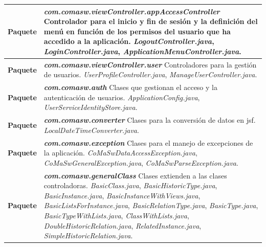 \begin{longtable}{m{1cm} m{11cm}}
\textbf{Paquete} & \textit{\textbf{com.comasw.viewController.appAccessController}} \newline
     Controlador para el inicio y fin de sesión y la definición del menú en función de los permisos del usuario que ha accedido a la aplicación.\newline
\textit{LogoutController.java},
\textit{LoginController.java},
\textit{ApplicationMenuController.java}.
	\\\hline


	\textbf{Paquete} & \textit{\textbf{com.comasw.viewController.user}} \newline
     Controladores para la gestión de usuarios.\newline
\textit{UserProfileController.java},
\textit{ManageUserController.java}.
	\\\hline

	\textbf{Paquete} & \textit{\textbf{com.comasw.auth}} \newline
     Clases que gestionan el acceso y la autenticación de usuarios.\newline
\textit{ApplicationConfig.java},
\textit{UserServiceIdentityStore.java}.
	\\\hline

	\textbf{Paquete} & \textit{\textbf{com.comasw.converter}} \newline
     Clases para la conversión de datos en \acrshort{jsf}.\newline
\textit{LocalDateTimeConverter.java}.
	\\\hline

	\textbf{Paquete} & \textit{\textbf{com.comasw.exception}} \newline
     Clases para el manejo de excepciones de la aplicación.\newline
\textit{CoMaSwDataAccessException.java},
\textit{CoMaSwGeneralException.java},
\textit{CoMaSwParseException.java}.
	\\\hline

	\textbf{Paquete} & \textit{\textbf{com.comasw.generalClass}} \newline
     Clases extienden a las clases controladoras.\newline
\textit{BasicClass.java},
\textit{BasicHistoricType.java},
\textit{BasicInstance.java},
\textit{BasicInstanceWithViews.java},
\textit{BasicListsForInstance.java},
\textit{BasicRelationType.java},
\textit{BasicType.java},
\textit{BasicTypeWithLists.java},
\textit{ClassWithLists.java},
\textit{DoubleHistoricRelation.java},
\textit{RelatedInstance.java},
\textit{SimpleHistoricRelation.java}.
	\\\hline


\end{longtable}
